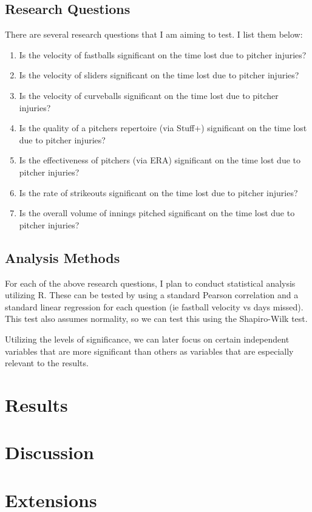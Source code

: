 \documentclass{article}
\begin{document}
\subsection{Research Questions}

There are several research questions that I am aiming to test. I list them below:

\begin{enumerate}
  \def\labelenumi{\arabic{enumi}.}
  \item
    Is the velocity of fastballs significant on the time lost due to pitcher injuries?
  \item
    Is the velocity of sliders significant on the time lost due to pitcher injuries?
  \item
    Is the velocity of curveballs significant on the time lost due to pitcher injuries?
  \item
    Is the quality of a pitchers repertoire (via Stuff+) significant on the time lost due to pitcher injuries?
  \item
    Is the effectiveness of pitchers (via ERA) significant on the time lost due to pitcher injuries?
  \item
    Is the rate of strikeouts significant on the time lost due to pitcher injuries?
  \item
    Is the overall volume of innings pitched significant on the time lost due to pitcher injuries?
\end{enumerate}

\subsection{Analysis Methods}
For each of the above research questions, I plan to conduct statistical analysis utilizing R. These can be tested by using a standard Pearson correlation and a standard linear regression for each question (ie fastball velocity vs days missed). This test also assumes normality, so we can test this using the Shapiro-Wilk test.

Utilizing the levels of significance, we can later focus on certain independent variables that are more significant than others as variables that are especially relevant to the results.

\section{Results}

\section{Discussion}

\section{Extensions}
\end{document}
